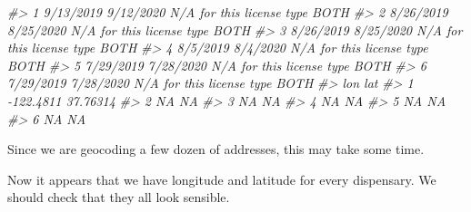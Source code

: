 \documentclass[
  12pt,
]{book}
\newenvironment{Shaded}{\begin{snugshade}}{\end{snugshade}}
\newcommand{\CommentTok}[1]{\textcolor[rgb]{0.37,0.37,0.37}{\textit{#1}}}
\newcommand{\ControlFlowTok}[1]{\textcolor[rgb]{0.27,0.27,0.27}{\textbf{#1}}}
\newcommand{\DecValTok}[1]{\textcolor[rgb]{0.06,0.06,0.06}{#1}}
\newcommand{\KeywordTok}[1]{\textcolor[rgb]{0.27,0.27,0.27}{\textbf{#1}}}
\newcommand{\NormalTok}[1]{#1}
\newcommand{\OperatorTok}[1]{\textcolor[rgb]{0.43,0.43,0.43}{\textbf{#1}}}
\newcommand{\StringTok}[1]{\textcolor[rgb]{0.5,0.5,0.5}{#1}}
\begin{document}
\begin{Shaded}
\begin{Highlighting}[]
\CommentTok{\#> 1  9/13/2019       9/12/2020 N/A for this license type                BOTH}
\CommentTok{\#> 2  8/26/2019       8/25/2020 N/A for this license type                BOTH}
\CommentTok{\#> 3  8/26/2019       8/25/2020 N/A for this license type                BOTH}
\CommentTok{\#> 4   8/5/2019        8/4/2020 N/A for this license type                BOTH}
\CommentTok{\#> 5  7/29/2019       7/28/2020 N/A for this license type                BOTH}
\CommentTok{\#> 6  7/29/2019       7/28/2020 N/A for this license type                BOTH}
\CommentTok{\#>         lon      lat}
\CommentTok{\#> 1 {-}122.4811 37.76314}
\CommentTok{\#> 2        NA       NA}
\CommentTok{\#> 3        NA       NA}
\CommentTok{\#> 4        NA       NA}
\CommentTok{\#> 5        NA       NA}
\CommentTok{\#> 6        NA       NA}
\end{Highlighting}
\end{Shaded}

Since we are geocoding a few dozen of addresses, this may take some time.

\begin{Shaded}
\end{Shaded}

Now it appears that we have longitude and latitude for every dispensary. We should check that they all look sensible.

\begin{Shaded}
\end{Shaded}

\begin{Shaded}
\end{Shaded}
\end{document}
